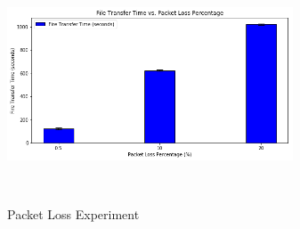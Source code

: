 \documentclass[conference]{IEEEtran}
\begin{document}
\begin{figure}[t]
\includegraphics[width=8.5cm, height=7cm]{experiment-loss.png}
 \caption{Packet Loss Experiment}
 \label{fig:1}
\end{figure}
\end{document}

